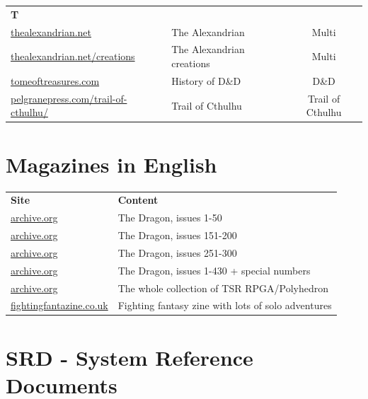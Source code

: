 \documentclass[a4paper, 11pt, twoside]{article}
\begin{document}
\begin{longtable}{llc}
\textbf{T} &  & \\
\href{http://thealexandrian.net/index.html}{thealexandrian.net} & The Alexandrian & Multi\\
\href{http://www.thealexandrian.net/creations/creations.html}{thealexandrian.net/creations} & The Alexandrian creations & Multi\\
\href{http://www.tomeoftreasures.com/tot\_adnd/adnd\_history.htm}{tomeoftreasures.com} & History of D\&D & D\&D\\
\href{http://site.pelgranepress.com/index.php/category/products/trail-of-cthulhu/}{pelgranepress.com/trail-of-cthulhu/} & Trail of Cthulhu & Trail of Cthulhu\\
\end{longtable}

\section{Magazines in English}
\label{sec:org4034025}

\begin{longtable}{ll}
\textbf{Site} & \textbf{Content}\\
\href{https://archive.org/details/DragonMagazine045\_201903}{archive.org} & The Dragon, issues 1-50\\
\href{https://archive.org/details/DragonMagazine200\_201903/dragon\%2520151-200/Dragon\%2520Magazine\%2520\%2523151/page/n0/mode/2up}{archive.org} & The Dragon, issues 151-200\\
\href{https://archive.org/details/DragonMagazine200\_201903/dragon\%2520151-200/Dragon\%2520Magazine\%2520\%2523151/page/n0/mode/2up}{archive.org} & The Dragon, issues 251-300\\
\href{https://archive.org/details/DragonMagazine260\_201801/Dragon\%2520Magazine\%2520430/mode/2up}{archive.org} & The Dragon, issues 1-430 + special numbers\\
\href{https://archive.org/details/Polyhedron105}{archive.org} & The whole collection of TSR RPGA/Polyhedron\\
\href{http://www.fightingfantazine.co.uk/page/}{fightingfantazine.co.uk} & Fighting fantasy zine with lots of solo adventures\\
\end{longtable}

\section{SRD - System Reference Documents}
\label{sec:org00e6fcc}
\end{document}
